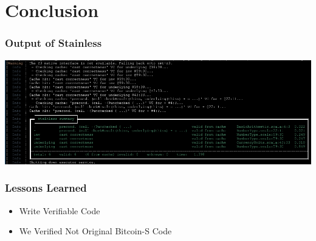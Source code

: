 \documentclass{beamer}
\begin{document}


\section{Conclusion}

\begin{frame}
\frametitle{Output of Stainless}
\centering
\includegraphics[width=\textwidth,height=0.8\textheight,keepaspectratio]{assets/final_verify_output.png}
\end{frame}

\begin{frame}
\frametitle{Lessons Learned}
\begin{itemize}
  \item Write Verifiable Code
  \item We Verified Not Original Bitcoin-S Code
\end{itemize}
\end{frame}
\end{document}
